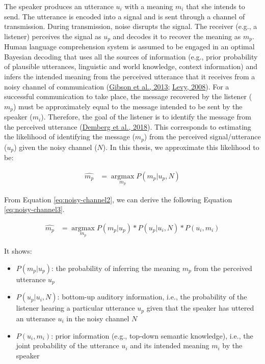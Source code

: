 \documentclass[a4paper, nobind]{templates/ociamthesis}
\providecommand{\tightlist}{%
  \setlength{\itemsep}{0pt}\setlength{\parskip}{0pt}}
\begin{document}
The speaker produces an utterance \(u_i\) with a meaning \(m_i\) that she intends to send.
The utterance is encoded into a signal and is sent through a channel of transmission.
During transmission, noise disrupts the signal.
The receiver (e.g., a listener) perceives the signal as \(u_p\) and decodes it to recover the meaning as \(m_p\).
Human language comprehension system is assumed to be engaged in an optimal Bayesian decoding that uses all the sources of information
(e.g., prior probability of plausible utterances, linguistic and world knowledge, context information)
and infers the intended meaning from the perceived utterance that it receives from a noisy channel of communication (\protect\hyperlink{ref-Gibson2013}{Gibson et al., 2013}; \protect\hyperlink{ref-Levy2008}{Levy, 2008}).
For a successful communication to take place, the message recovered by the listener (\(m_p\)) must be approximately equal to the message intended to be sent by the speaker (\(m_i\)).
Therefore, the goal of the listener is to identify the message from the perceived utterance (\protect\hyperlink{ref-Demberg2018}{Demberg et al., 2018}).
This corresponds to estimating the likelihood of identifying the message (\(m_p\)) from the perceived signal/utterance (\(u_p\)) given the noisy channel (\(N\)).
In this thesis, we approximate this likelihood to be:

\begin{align} \label{eq:noisy-channel2}
\hat{m_p} &= \mathop{\mathrm{argmax}}\limits_{m_p} P(m_p | u_p, N)
\end{align}

From Equation \eqref{eq:noisy-channel2}, we can derive the following Equation \eqref{eq:noisy-channel3}.

\begin{align} \label{eq:noisy-channel3}
\hat{m_p} &= \mathop{\mathrm{argmax}}\limits_{m_p} P(m_p | u_p) * P(u_p | u_i, N) * P(u_i , m_i)
\end{align}

It shows:

\begin{itemize}
\tightlist
\item
  \(P(m_p | u_p)\): the probability of inferring the meaning \(m_p\) from the perceived utterance \(u_p\)
\item
  \(P(u_p|u_i, N)\): bottom-up auditory information, i.e., the probability of the listener hearing a particular utterance \(u_p\) given that the speaker has uttered an utterance \(u_i\) in the noisy channel \(N\)
\item
  \(P(u_i,m_i)\): prior information (e.g., top-down semantic knowledge), i.e., the joint probability of the utterance \(u_i\) and its intended meaning \(m_i\) by the speaker
\end{itemize}
\end{document}
